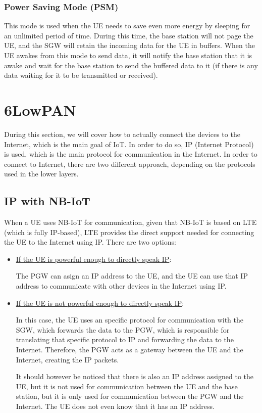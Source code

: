 \subsubsection{Power Saving Mode (PSM)}

This mode is used when the UE needs to save even more energy by sleeping for an unlimited period of time. During this time, the base station will not page the UE, and the SGW will retain the incoming data for the UE in buffers. When the UE awakes from this mode to send data, it will notify the base station that it is awake and wait for the base station to send the buffered data to it (if there is any data waiting for it to be transmitted or received).



\section{6LowPAN}

During this section, we will cover how to actually connect the devices to the Internet, which is the main goal of IoT. In order to do so, IP (Internet Protocol) is used, which is the main protocol for communication in the Internet. In order to connect to Internet, there are two different approach, depending on the protocols used in the lower layers.

\subsection{IP with NB-IoT}

When a UE uses NB-IoT for communication, given that NB-IoT is based on LTE (which is fully IP-based), LTE provides the direct support needed for connecting the UE to the Internet using IP. There are two options:
\begin{itemize}
    \item \ul{If the UE is powerful enough to directly speak IP}:
    
    The PGW can asign an IP address to the UE, and the UE can use that IP address to communicate with other devices in the Internet using IP.

    \item \ul{If the UE is not powerful enough to directly speak IP}:
    
    In this case, the UE uses an specific protocol for communication with the SGW, which forwards the data to the PGW, which is responsible for translating that specific protocol to IP and forwarding the data to the Internet. Therefore, the PGW acts as a gateway between the UE and the Internet, creating the IP packets.
    
    It should however be noticed that there is also an IP address assigned to the UE, but it is not used for communication between the UE and the base station, but it is only used for communication between the PGW and the Internet. The UE does not even know that it has an IP address.
\end{itemize}

